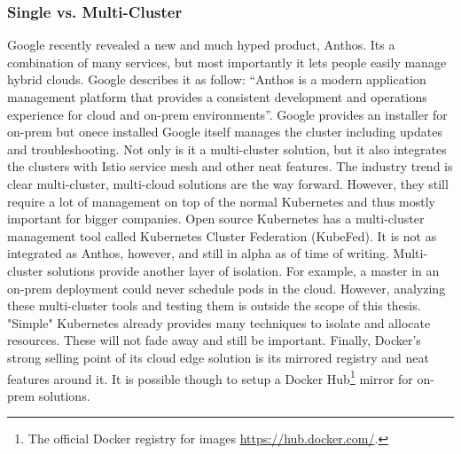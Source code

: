 \subsubsection{Single vs. Multi-Cluster} \label{sec:singleVsMultiCluster}
Google recently revealed a new and much hyped product, Anthos\cite{TechnicalAnthosGoogle66:online}. Its a combination of many services, but most importantly it lets people easily manage hybrid clouds. Google describes it as follow: ``Anthos is a modern application management platform that provides a consistent development and operations experience for cloud and on-prem environments''\cite{TechnicalAnthosGoogle66:online}. Google provides an installer for on-prem but onece installed Google itself manages the cluster including updates and troubleshooting. Not only is it a multi-cluster solution, but it also integrates the clusters with Istio service mesh and other neat features. The industry trend is clear multi-cluster, multi-cloud solutions are the way forward. However, they still require a lot of management on top of the normal Kubernetes and thus mostly important for bigger companies. Open source Kubernetes has a multi-cluster management tool called Kubernetes Cluster Federation (KubeFed)\cite{kubernetesFederation97:online}. It is not as integrated as Anthos, however, and still in alpha as of time of writing. Multi-cluster solutions provide another layer of isolation. For example, a master in an on-prem deployment could never schedule pods in the cloud. However, analyzing these multi-cluster tools and testing them is outside the scope of this thesis. "Simple" Kubernetes already provides many techniques to isolate and allocate resources. These will not fade away and still be important. Finally, Docker's strong selling point of its cloud edge solution is its mirrored registry and neat features around it. It is possible though to setup a Docker Hub\footnote{The official Docker registry for images \url{https://hub.docker.com/}.} mirror for on-prem solutions. 
